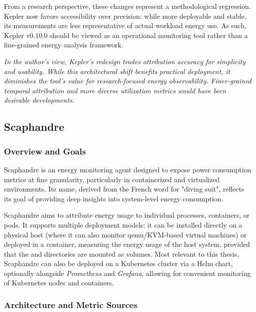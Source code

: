 From a research perspective, these changes represent a methodological regression. Kepler now favors accessibility over precision: while more deployable and stable, its measurements are less representative of actual workload energy use. As such, Kepler v0.10.0 should be viewed as an operational monitoring tool rather than a fine-grained energy analysis framework.

\textit{In the author's view, Kepler's redesign trades attribution accuracy for simplicity and usability. While this architectural shift benefits practical deployment, it diminishes the tool's value for research-focused energy observability. Finer-grained temporal attribution and more diverse utilization metrics would have been desirable developments.}

\subsection{Scaphandre}
\label{sec:scaphandre}

\subsubsection{Overview and Goals}
\label{sec:scaphandre-overview}

Scaphandre\parencite{scaphandre_github} is an energy monitoring agent designed to expose power consumption metrics at fine granularity, particularly in containerized and virtualized environments. Its name, derived from the French word for "diving suit", reflects its goal of providing deep insights into system-level energy consumption.

Scaphandre aims to attribute energy usage to individual processes, containers, or pods. It supports multiple deployment models: it can be installed directly on a physical host (where it can also monitor qemu/KVM-based virtual machines) or deployed in a container, measuring the energy usage of the host system, provided that the  and  directories are mounted as volumes. Most relevant to this thesis, Scaphandre can also be deployed on a Kubernetes cluster via a Helm chart, optionally alongside \textit{Prometheus} and \textit{Grafana}, allowing for convenient monitoring of Kubernetes nodes and containers.

\subsubsection{Architecture and Metric Sources}
\label{sec:scaphandre-architecture}

